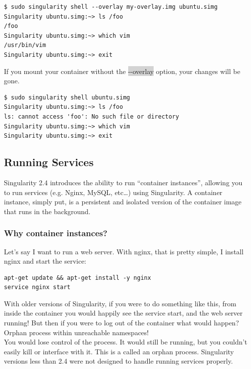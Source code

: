 \documentclass[a4paper]{article}
\begin{document}
\begin{lstlisting}[frame=single] 
$ sudo singularity shell --overlay my-overlay.img ubuntu.simg
Singularity ubuntu.simg:~> ls /foo
/foo
Singularity ubuntu.simg:~> which vim
/usr/bin/vim
Singularity ubuntu.simg:~> exit
\end{lstlisting}


If you mount your container without the \colorbox{lightgray}{-{}-overlay} option, your changes will be gone.

\begin{lstlisting}[frame=single]  
$ sudo singularity shell ubuntu.simg
Singularity ubuntu.simg:~> ls /foo
ls: cannot access 'foo': No such file or directory
Singularity ubuntu.simg:~> which vim
Singularity ubuntu.simg:~> exit
\end{lstlisting}

\subsection{Running Services}

Singularity 2.4 introduces the ability to run “container instances”, allowing you to run services (e.g. Nginx, MySQL, etc…) using Singularity. A container instance, simply put, is a persistent and isolated version of the container image that runs in the background.

\subsubsection{Why container instances?}
\label{sec:instances}
Let’s say I want to run a web server. With nginx, that is pretty simple, I install nginx and start the service:

\begin{lstlisting}[frame=single]
apt-get update && apt-get install -y nginx
service nginx start
\end{lstlisting}

With older versions of Singularity, if you were to do something like this, from inside the container you would happily see the service start, and the web server running! But then if you were to log out of the container what would happen?\\[0.1in]
Orphan process within unreachable namespaces!\\[0.1in]
You would lose control of the process. It would still be running, but you couldn’t easily kill or interface with it. This is a called an orphan process. Singularity versions less than 2.4 were not designed to handle running services properly.
\end{document}
